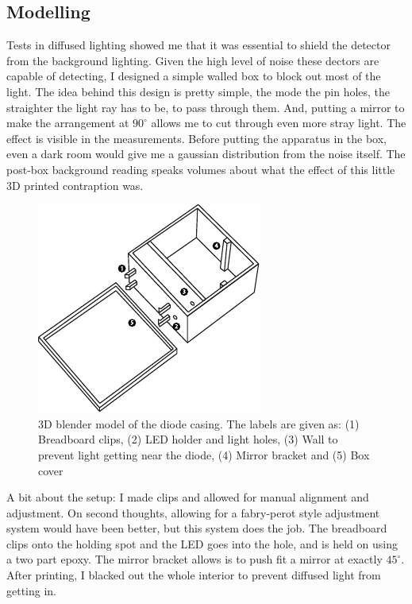 \documentclass{double}
\begin{document}
\begin{multicols*}{2}
\section{Modelling}
\label{model}
Tests in diffused lighting showed me that it was essential to shield the detector from the background lighting. Given the high level of noise these dectors are capable of detecting, I designed a simple walled box to block out most of the light. The idea behind this design is pretty simple, the mode the pin holes, the straighter the light ray has to be, to pass through them. And, putting a mirror to make the arrangement at $90^\circ$ allows me to cut through even more stray light. The effect is visible in the measurements. Before putting the apparatus in the box, even a dark room would give me a gaussian distribution from the noise itself. The post-box background reading speaks volumes about what the effect of this little 3D printed contraption was.
\begin{figure}[H]
	\centering
	\includegraphics[width=0.8\columnwidth]{images/model.pdf}
	\caption{3D blender model of the diode casing. The labels are given as: (1) Breadboard clips, (2) LED holder and light holes, (3) Wall to prevent light getting near the diode, (4) Mirror bracket and (5) Box cover}
\end{figure}
A bit about the setup: I made clips and allowed for manual alignment and adjustment. On second thoughts, allowing for a fabry-perot style adjustment system would have been better, but this system does the job. The breadboard clips onto the holding spot and the LED goes into the hole, and is held on using a two part epoxy. The mirror bracket allows is to push fit a mirror at exactly $45^\circ$. After printing, I blacked out the whole interior to prevent diffused light from getting in.


\end{multicols*}
\end{document}
